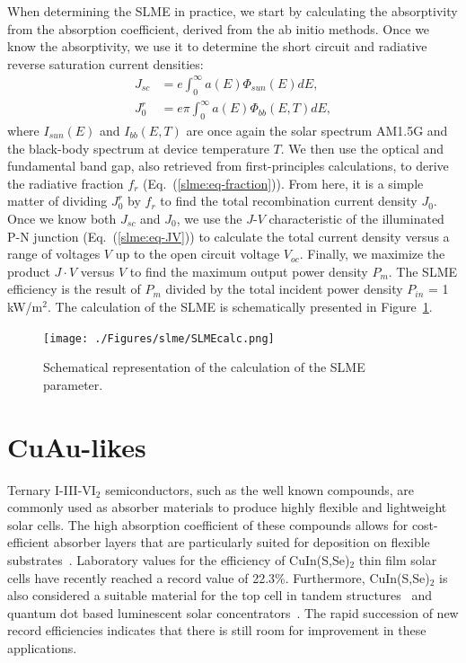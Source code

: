 \begin{refsection}
When determining the SLME in practice, we start by calculating the 
absorptivity from the absorption coefficient, derived from the ab initio 
methods. Once we know the absorptivity, we use it to determine the short 
circuit and radiative reverse saturation current densities: 
\begin{equation} \label{slme:eq-currents} 
\begin{aligned} 
J_{sc} &= e \int_0^\infty a(E)  \Phi_{sun} (E) dE, 
\\ J_0^r &= e\pi \int_0^\infty a(E)  \Phi_{bb} (E,T) dE, 
\end{aligned} 
\end{equation} 
where $I_{sun}(E)$ and $I_{bb}(E,T)$ are once again the solar spectrum AM1.5G  
and the black-body spectrum at device temperature $T$. We then use the optical 
and fundamental band gap, also retrieved from first-principles calculations, 
to derive the radiative fraction $f_r$ (Eq.~(\ref{slme:eq-fraction})). From 
here, it is a simple matter of dividing $J_0^r$ by $f_r$ to find the total 
recombination current density $J_0$. Once we know both $J_{sc}$ and $J_0$, we 
use the $J$-$V$ characteristic of the illuminated P-N junction 
(Eq.~(\ref{slme:eq-JV})) to calculate the total current density versus a range 
of voltages $V$ up to the open circuit voltage $V_{oc}$. Finally, we maximize 
the product $J\cdot V$ versus $V$ to find the maximum output power density 
$P_m$. The SLME efficiency is the result of $P_m$ divided by the total 
incident power density $P_{in}$ = 1 kW/m$^2$. The calculation of the SLME is 
schematically presented in Figure~\ref{slme:fig-SLMEcalc}. 
 
\begin{figure}[h]  
\centering 
\texttt{[image: ./Figures/slme/SLMEcalc.png]} 
\caption{Schematical representation of the calculation of the SLME parameter.} 
\label{slme:fig-SLMEcalc} 
\end{figure} 
 
\section{CuAu-likes} \label{slme:sec-CuAu} 
 
Ternary I-III-VI$_2$ semiconductors, such as the well known 
 compounds, are commonly used as absorber materials to 
produce highly flexible and lightweight solar cells. The high absorption 
coefficient of these compounds allows for cost-efficient absorber layers that 
are particularly suited for deposition on flexible 
substrates~\cite{Reinhard2013}. Laboratory values for the efficiency of 
CuIn(S,Se)$_2$ thin film solar cells have recently reached a record value of 
22.3\%. Furthermore, CuIn(S,Se)$_2$ is also considered a suitable material for 
the top cell in tandem structures~\cite{Cheek2013} and quantum dot based 
luminescent solar concentrators~\cite{Hu2015}. The rapid succession of new 
record efficiencies indicates that there is still room for improvement in 
these applications. 
 

\end{refsection}

